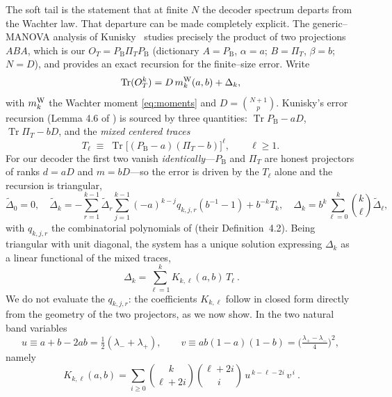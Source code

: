 \documentclass[11pt]{article}
\newcommand{\Tr}{\operatorname{Tr}}
\newcommand{\PB}{P_{\mathrm B}}
\newcommand{\PiT}{\Pi_T}
\newcommand{\OT}{O_T}
\begin{document}
The soft tail is the statement that at finite $N$ the decoder spectrum departs from the Wachter law.
That departure can be made completely explicit. The generic--MANOVA analysis of
Kunisky~\cite{Kunisky} studies precisely the product of two projections $ABA$, which is our
$\OT=\PB\PiT\PB$ (dictionary $A=\PB$, $\alpha=a$; $B=\PiT$, $\beta=b$; $N=D$), and provides an exact
recursion for the finite--size error. Write
\begin{equation}
  \Tr(\OT^k)=D\,m_k^{\rm W}(a,b)+\Delta_k ,
  \label{eq:errdef}
\end{equation}
with $m_k^{\rm W}$ the Wachter moment \eqref{eq:moments} and $D=\binom{N+1}{p}$. Kunisky's error
recursion (Lemma 4.6 of \cite{Kunisky}) is sourced by three quantities: $\Tr\PB-aD$, $\Tr\PiT-bD$, and
the \emph{mixed centered traces}
\begin{equation}
  T_\ell\;\equiv\;\Tr\big[(\PB-a)(\PiT-b)\big]^\ell,\qquad \ell\ge1 .
  \label{eq:mixed}
\end{equation}
For our decoder the first two vanish \emph{identically}---$\PB$ and $\PiT$ are honest projectors of
ranks $d=aD$ and $m=bD$---so the error is driven by the $T_\ell$ alone and the recursion is triangular,
\begin{equation}
  \tilde\Delta_0=0,\quad
  \tilde\Delta_k=-\sum_{r=1}^{k-1}\tilde\Delta_r\sum_{j=1}^{k-1}(-a)^{k-j}q_{k,j,r}(b^{-1}{-}1)+b^{-k}T_k,
  \quad \Delta_k=b^k\sum_{\ell=0}^k\binom{k}{\ell}\tilde\Delta_\ell ,
  \label{eq:errrec}
\end{equation}
with $q_{k,j,r}$ the combinatorial polynomials of \cite{Kunisky} (their Definition~4.2). Being
triangular with unit diagonal, the system has a unique solution expressing $\Delta_k$ as a linear
functional of the mixed traces,
\begin{equation}
  \boxed{\ \Delta_k=\sum_{\ell=1}^k K_{k,\ell}(a,b)\,T_\ell\ } .
  \label{eq:errsolved}
\end{equation}
We do not evaluate the $q_{k,j,r}$: the coefficients $K_{k,\ell}$ follow in closed form directly from the
geometry of the two projectors, as we now show. In the two natural band variables
\begin{equation}
  u\equiv a+b-2ab=\tfrac12(\lambda_-+\lambda_+),\qquad
  v\equiv ab(1-a)(1-b)=\Big(\tfrac{\lambda_+-\lambda_-}{4}\Big)^{2} ,
  \label{eq:uv}
\end{equation}
namely
\begin{equation}
  \boxed{\ K_{k,\ell}(a,b)=\sum_{i\ge0}\binom{k}{\ell+2i}\binom{\ell+2i}{i}\,u^{\,k-\ell-2i}\,v^{\,i}\ } .
  \label{eq:Kclosed}
\end{equation}
\end{document}
